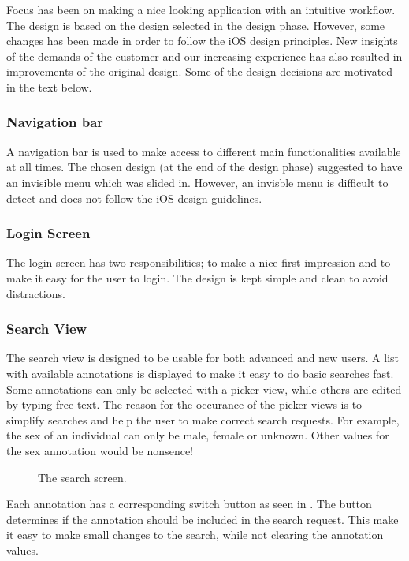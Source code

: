 Focus has been on making a nice looking application with an intuitive workflow. The design is based on the design selected in the design phase. However, some changes has been made in order to follow the iOS design principles. New insights of the demands of the customer and our increasing experience has also resulted in improvements of the original design. Some of the design decisions are motivated in the text below.


\subsubsection{Navigation bar}
A navigation bar is used to make access to different main functionalities available at all times. The chosen design (at the end of the design phase) suggested to have an invisible menu which was slided in. However, an invisble menu is difficult to detect and does not follow the iOS design guidelines.


\subsubsection{Login Screen}
The login screen has two responsibilities; to make a nice first impression and to make it easy for the user to login. The design is kept simple and clean to avoid distractions.

\subsubsection{Search View}
The search view is designed to be usable for both advanced and new users. A list with available annotations is displayed to make it easy to do basic searches fast. Some annotations can only be selected with a picker view, while others are edited by typing free text. The reason for the occurance of the picker views is to simplify searches and help the user to make correct search requests. For example, the sex of an individual can only be male, female or unknown. Other values for the sex annotation would be nonsence!

\begin{figure}[ht]
\caption{The search screen.}
\label{fig:ios_search2}
\end{figure}
\FloatBarrier

Each annotation has a corresponding switch button as seen in . The button determines if the annotation should be included in the search request. This make it easy to make small changes to the search, while not clearing the annotation values.

